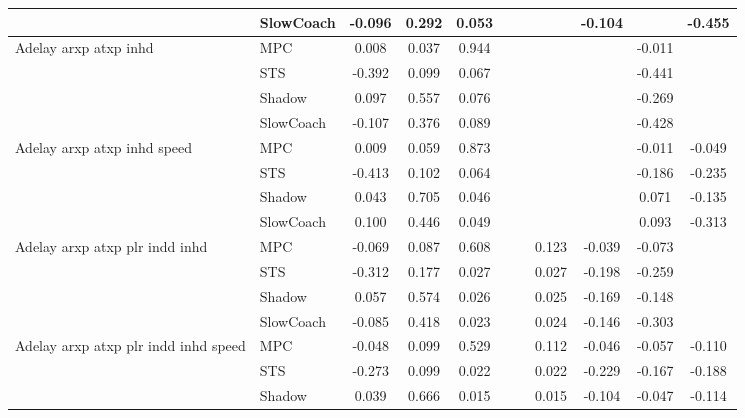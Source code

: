 \begin{tabular}{|l|l|*{9}{c|}}
                              & SlowCoach &   -0.096 &     0.292 &     0.053 &     &     &     &  -0.104 &      &   -0.455 \\
\midrule
Adelay arxp atxp inhd    & MPC &    0.008 &     0.037 &     0.944 &     &     &     &      &  -0.011 &       \\
                              & STS &   -0.392 &     0.099 &     0.067 &     &     &     &      &  -0.441 &       \\
                              & Shadow &    0.097 &     0.557 &     0.076 &     &     &     &      &  -0.269 &       \\
                              & SlowCoach &   -0.107 &     0.376 &     0.089 &     &     &     &      &  -0.428 &       \\
\midrule
Adelay arxp atxp inhd speed    & MPC &    0.009 &     0.059 &     0.873 &     &     &     &      &  -0.011 &   -0.049 \\
                              & STS &   -0.413 &     0.102 &     0.064 &     &     &     &      &  -0.186 &   -0.235 \\
                              & Shadow &    0.043 &     0.705 &     0.046 &     &     &     &      &   0.071 &   -0.135 \\
                              & SlowCoach &    0.100 &     0.446 &     0.049 &     &     &     &      &   0.093 &   -0.313 \\
\midrule
Adelay arxp atxp plr indd inhd    & MPC &   -0.069 &     0.087 &     0.608 &     &     &  0.123 &  -0.039 &  -0.073 &       \\
                              & STS &   -0.312 &     0.177 &     0.027 &     &     &  0.027 &  -0.198 &  -0.259 &       \\
                              & Shadow &    0.057 &     0.574 &     0.026 &     &     &  0.025 &  -0.169 &  -0.148 &       \\
                              & SlowCoach &   -0.085 &     0.418 &     0.023 &     &     &  0.024 &  -0.146 &  -0.303 &       \\
\midrule
Adelay arxp atxp plr indd inhd speed    & MPC &   -0.048 &     0.099 &     0.529 &     &     &  0.112 &  -0.046 &  -0.057 &   -0.110 \\
                              & STS &   -0.273 &     0.099 &     0.022 &     &     &  0.022 &  -0.229 &  -0.167 &   -0.188 \\
                              & Shadow &    0.039 &     0.666 &     0.015 &     &     &  0.015 &  -0.104 &  -0.047 &   -0.114 \\

\end{tabular}
